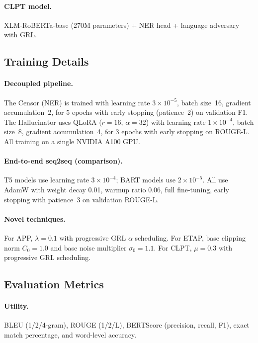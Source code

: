 \documentclass[11pt,a4paper]{article}
\begin{document}
\paragraph{CLPT model.}
XLM-RoBERTa-base \cite{conneau2020unsupervised} (270M parameters) + NER
head + language adversary with GRL.

\subsection{Training Details}

\paragraph{Decoupled pipeline.}
The Censor (NER) is trained with learning rate $3 \times 10^{-5}$, batch
size~16, gradient accumulation~2, for 5 epochs with early stopping
(patience~2) on validation F1.  The Hallucinator uses QLoRA ($r\!=\!16$,
$\alpha\!=\!32$) with learning rate $1 \times 10^{-4}$, batch size~8,
gradient accumulation~4, for 3 epochs with early stopping on ROUGE-L.
All training on a single NVIDIA A100 GPU.

\paragraph{End-to-end seq2seq (comparison).}
T5 models use learning rate $3 \times 10^{-4}$; BART models use $2 \times 10^{-5}$.
All use AdamW with weight decay 0.01, warmup ratio 0.06, full fine-tuning,
early stopping with patience~3 on validation ROUGE-L.

\paragraph{Novel techniques.}
For APP, $\lambda = 0.1$ with progressive GRL $\alpha$ scheduling.  For ETAP,
base clipping norm $C_0 = 1.0$ and base noise multiplier $\sigma_0 = 1.1$.
For CLPT, $\mu = 0.3$ with progressive GRL scheduling.

\subsection{Evaluation Metrics}

\paragraph{Utility.}
BLEU (1/2/4-gram), ROUGE (1/2/L), BERTScore (precision, recall, F1), exact
match percentage, and word-level accuracy.
\end{document}
